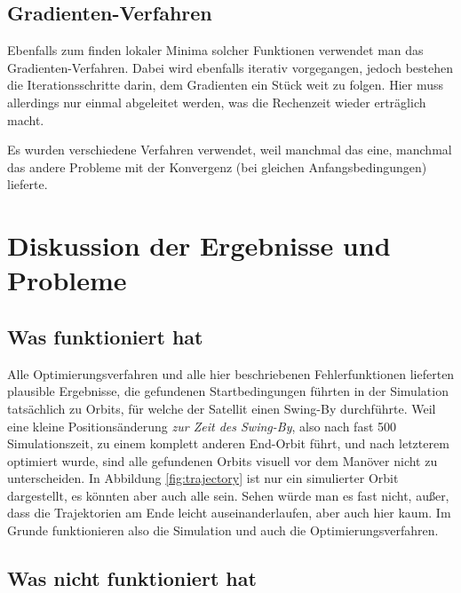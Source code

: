 \subsection{Gradienten-Verfahren}

Ebenfalls zum finden lokaler Minima solcher Funktionen verwendet man das Gradienten-Verfahren. Dabei wird ebenfalls iterativ vorgegangen, jedoch bestehen die Iterationsschritte darin, dem Gradienten ein Stück weit zu folgen. Hier muss allerdings nur einmal abgeleitet werden, was die Rechenzeit wieder erträglich macht.

\vspace{1.5cm}

Es wurden verschiedene Verfahren verwendet, weil manchmal das eine, manchmal das andere Probleme mit der Konvergenz (bei gleichen Anfangsbedingungen) lieferte.

\section{Diskussion der Ergebnisse und Probleme}

\subsection{Was funktioniert hat}

Alle Optimierungsverfahren und alle hier beschriebenen Fehlerfunktionen lieferten plausible Ergebnisse, die gefundenen Startbedingungen führten in der Simulation tatsächlich zu Orbits, für welche der Satellit einen Swing-By durchführte. Weil eine kleine Positionsänderung \textit{zur Zeit des Swing-By}, also nach fast 500 Simulationszeit, zu einem komplett anderen End-Orbit führt, und nach letzterem optimiert wurde, sind alle gefundenen Orbits visuell vor dem Manöver nicht zu unterscheiden. In Abbildung \ref{fig:trajectory} ist nur ein simulierter Orbit dargestellt, es könnten aber auch alle sein. Sehen würde man es fast nicht, außer, dass die Trajektorien am Ende leicht auseinanderlaufen, aber auch hier kaum. Im Grunde funktionieren also die Simulation und auch die Optimierungsverfahren.


\subsection{Was nicht funktioniert hat}

